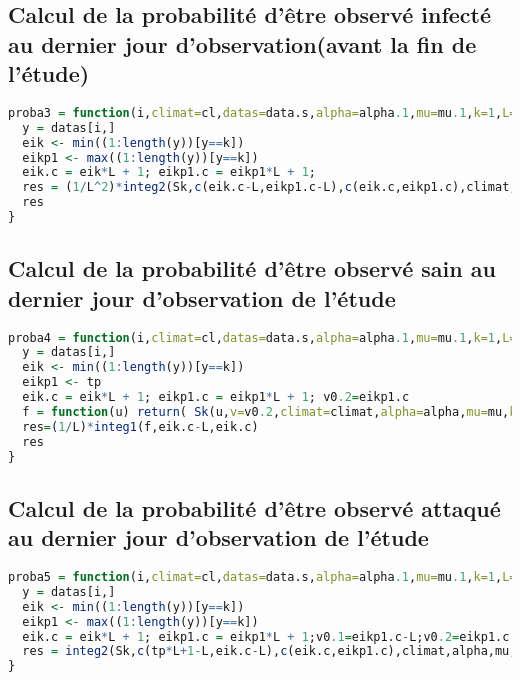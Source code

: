 \documentclass[12pt,a4paper]{scrbook}
\begin{document}
	\subsection{Calcul de la probabilité d'être observé infecté au dernier jour d'observation(avant la fin de l'étude)}
	\begin{lstlisting}[language=R]
proba3 = function(i,climat=cl,datas=data.s,alpha=alpha.1,mu=mu.1,k=1,L=7,w0k=w0.1){
  y = datas[i,]
  eik <- min((1:length(y))[y==k]) 
  eikp1 <- max((1:length(y))[y==k]) 
  eik.c = eik*L + 1; eikp1.c = eikp1*L + 1;
  res = (1/L^2)*integ2(Sk,c(eik.c-L,eikp1.c-L),c(eik.c,eikp1.c),climat,alpha,mu,k,w0k)
  res
}
	\end{lstlisting}

	\subsection{Calcul de la probabilité d'être observé sain au dernier jour d'observation de l'étude}
	\begin{lstlisting}[language=R]
proba4 = function(i,climat=cl,datas=data.s,alpha=alpha.1,mu=mu.1,k=1,L=7,tp=20,w0k=w0.1){
  y = datas[i,]
  eik <- min((1:length(y))[y==k]) 
  eikp1 <- tp 
  eik.c = eik*L + 1; eikp1.c = eikp1*L + 1; v0.2=eikp1.c
  f = function(u) return( Sk(u,v=v0.2,climat=climat,alpha=alpha,mu=mu,k=k,w0k=w0k) ); f = Vectorize(f)
  res=(1/L)*integ1(f,eik.c-L,eik.c)
  res 
}
	\end{lstlisting}

	\subsection{Calcul de la probabilité d'être observé attaqué au dernier jour d'observation de l'étude}
	\begin{lstlisting}[language=R]
	proba5 = function(i,climat=cl,datas=data.s,alpha=alpha.1,mu=mu.1,k=1,L=7,tp=20,w0k=w0.1){
  y = datas[i,]
  eik <- min((1:length(y))[y==k]) 
  eikp1 <- max((1:length(y))[y==k]) 
  eik.c = eik*L + 1; eikp1.c = eikp1*L + 1;v0.1=eikp1.c-L;v0.2=eikp1.c
  res = integ2(Sk,c(tp*L+1-L,eik.c-L),c(eik.c,eikp1.c),climat,alpha,mu,k,w0k)
}
	\end{lstlisting}
	
\end{document}
